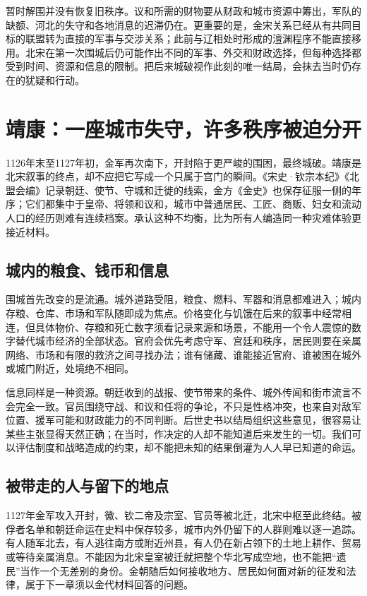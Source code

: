 暂时解围并没有恢复旧秩序。议和所需的财物要从财政和城市资源中筹出，军队的缺额、河北的失守和各地消息的迟滞仍在。更重要的是，金宋关系已经从有共同目标的联盟转为直接的军事与交涉关系；此前与辽相处时形成的澶渊程序不能直接移用。北宋在第一次围城后仍可能作出不同的军事、外交和财政选择，但每种选择都受到时间、资源和信息的限制。把后来城破视作此刻的唯一结局，会抹去当时仍存在的犹疑和行动。

\section{靖康：一座城市失守，许多秩序被迫分开}

1126年末至1127年初，金军再次南下，开封陷于更严峻的围困，最终城破。靖康是北宋叙事的终点，却不应把它写成一个只属于宫门的瞬间。《宋史·钦宗本纪》《北盟会编》记录朝廷、使节、守城和迁徙的线索，金方《金史》也保存征服一侧的年序；它们都集中于皇帝、将领和议和，城市中普通居民、工匠、商贩、妇女和流动人口的经历则难有连续档案。承认这种不均衡，比为所有人编造同一种灾难体验更接近材料。

\subsection{城内的粮食、钱币和信息}

围城首先改变的是流通。城外道路受阻，粮食、燃料、军器和消息都难进入；城内存粮、仓库、市场和军队随即成为焦点。价格变化与饥饿在后来的叙事中经常相连，但具体物价、存粮和死亡数字须看记录来源和场景，不能用一个令人震惊的数字替代城市经济的全部状态。官府会优先考虑守军、宫廷和秩序，居民则要在亲属网络、市场和有限的救济之间寻找办法；谁有储藏、谁能接近官府、谁被困在城外或城门附近，处境绝不相同。

信息同样是一种资源。朝廷收到的战报、使节带来的条件、城外传闻和街市流言不会完全一致。官员围绕守战、和议和任将的争论，不只是性格冲突，也来自对敌军位置、援军可能和财政能力的不同判断。后世史书以结局组织这些意见，很容易让某些主张显得天然正确；在当时，作决定的人却不能知道后来发生的一切。我们可以评估制度和战略造成的约束，却不能把未知的结果倒灌为人人早已知道的命运。

\subsection{被带走的人与留下的地点}

1127年金军攻入开封，徽、钦二帝及宗室、官员等被北迁，北宋中枢至此终结。被俘者名单和朝廷命运在史料中保存较多，城市内外仍留下的人群则难以逐一追踪。有人随军北去，有人逃往南方或附近州县，有人仍在新占领下的土地上耕作、贸易或等待亲属消息。不能因为北宋皇室被迁就把整个华北写成空地，也不能把“遗民”当作一个无差别的身份。金朝随后如何接收地方、居民如何面对新的征发和法律，属于下一章须以金代材料回答的问题。

